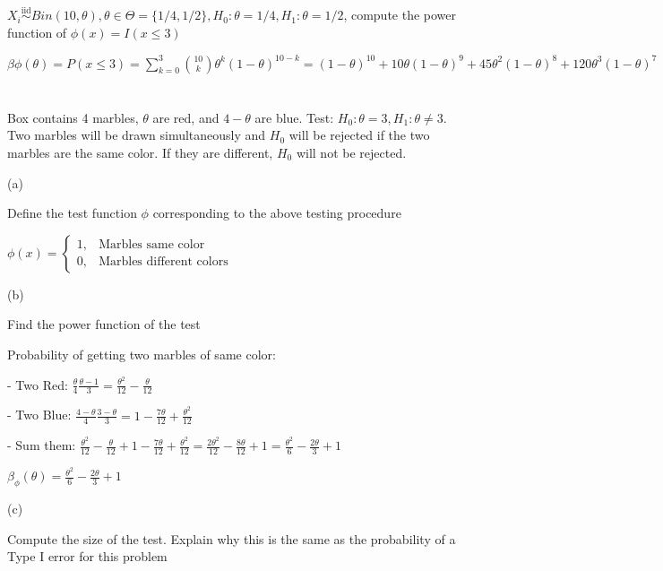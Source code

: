 \documentclass{article}
\let\Oldsum=\sum
\renewcommand{\sum}{\Oldsum\limits}
\newcommand{\iiddist}{\overset{\mathrm{iid}}{\sim}}
\begin{document}
\section{}

$X_i \iiddist Bin(10, \theta), \theta \in \Theta = \{1/4,1/2\}, H_0:\theta = 1/4, H_1: \theta = 1/2$, compute the power function of $\phi(x) = I(x \le 3)$

$\beta{\phi}(\theta) = P(x \le 3) = \sum_{k=0}^3 \binom{10}{k}\theta^k (1-\theta)^{10-k} = (1-\theta)^{10} + 10\theta(1-\theta)^9 + 45\theta^2(1-\theta)^8 + 120 \theta^3(1-\theta)^7$


\section{}

Box contains 4 marbles, $\theta$ are red, and $4-\theta$ are blue. Test: $H_0: \theta = 3, H_1: \theta \neq 3$. Two marbles will be drawn simultaneously and $H_0$ will be rejected if the two marbles are the same color. If they are different, $H_0$ will not be rejected.

(a)

Define the test function $\phi$ corresponding to the above testing procedure

$\phi(x) = \begin{cases} 1, & \text{Marbles same color} \\ 0, & \text{Marbles different colors} \end{cases}$

(b)

Find the power function of the test

Probability of getting two marbles of same color: 

- Two Red: $\frac{\theta}{4}\frac{\theta-1}{3} = \frac{\theta^2}{12} - \frac{\theta}{12}$

- Two Blue: $\frac{4-\theta}{4}\frac{3-\theta}{3} = 1 - \frac{7\theta}{12} + \frac{\theta^2}{12}$

- Sum them: $\frac{\theta^2}{12} - \frac{\theta}{12} + 1 - \frac{7\theta}{12} + \frac{\theta^2}{12} = \frac{2\theta^2}{12}-\frac{8\theta}{12} + 1 = \frac{\theta^2}{6} - \frac{2\theta}{3} + 1$

$\beta_{\phi}(\theta) = \frac{\theta^2}{6} - \frac{2\theta}{3} + 1$

(c)

Compute the size of the test. Explain why this is the same as the probability of a Type I error for this problem
\end{document}
